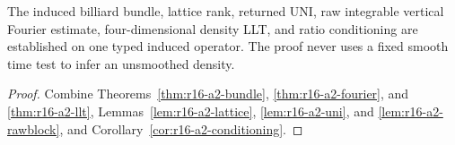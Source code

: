 \begin{theorem}
\label{thm:r16-a2-main}
The induced billiard bundle, lattice rank, returned UNI, raw integrable
vertical Fourier estimate, four-dimensional density LLT, and ratio
conditioning are established on one typed induced operator.  The proof never
uses a fixed smooth time test to infer an unsmoothed density.
\end{theorem}

\begin{proof}
Combine Theorems~\ref{thm:r16-a2-bundle},
\ref{thm:r16-a2-fourier}, and \ref{thm:r16-a2-llt},
Lemmas~\ref{lem:r16-a2-lattice}, \ref{lem:r16-a2-uni}, and
\ref{lem:r16-a2-rawblock}, and
Corollary~\ref{cor:r16-a2-conditioning}.
\end{proof}
